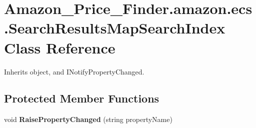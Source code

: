 \hypertarget{class_amazon___price___finder_1_1amazon_1_1ecs_1_1_search_results_map_search_index}{\section{Amazon\-\_\-\-Price\-\_\-\-Finder.\-amazon.\-ecs.\-Search\-Results\-Map\-Search\-Index Class Reference}
\label{class_amazon___price___finder_1_1amazon_1_1ecs_1_1_search_results_map_search_index}
}


 




Inherits object, and I\-Notify\-Property\-Changed.

\subsection*{Protected Member Functions}
\begin{DoxyCompactItemize}
\item 
\hypertarget{class_amazon___price___finder_1_1amazon_1_1ecs_1_1_search_results_map_search_index_a0a1897c351850d773b045b4be920af87}{void {\bfseries Raise\-Property\-Changed} (string property\-Name)}\label{class_amazon___price___finder_1_1amazon_1_1ecs_1_1_search_results_map_search_index_a0a1897c351850d773b045b4be920af87}

\end{DoxyCompactItemize}
